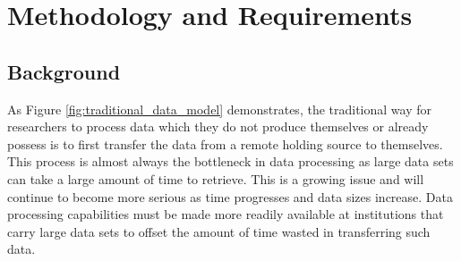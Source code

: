 
\chapter{Methodology and Requirements} %

\label{Chapter2} %




\section{Background}

As Figure \ref{fig:traditional_data_model} demonstrates, the traditional way for researchers to process data which they do not produce themselves or already possess is to first transfer the data from a remote holding source to themselves. This process is almost always the bottleneck in data processing as large data sets can take a large amount of time to retrieve. This is a growing issue and will continue to become more serious as time progresses and data sizes increase. Data processing capabilities must be made more readily available at institutions that carry large data sets to offset the amount of time wasted in transferring such data.

